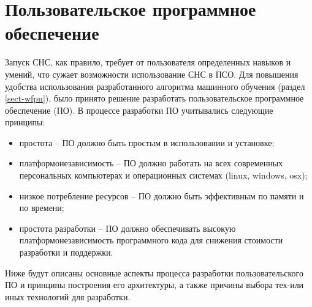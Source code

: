 \section{Пользовательское программное обеспечение}\label{sect-7}

Запуск СНС, как правило, требует от пользователя определенных навыков и умений, что сужает возможности использование СНС в ПСО. Для повышения удобства использования разработанного алгоритма машинного обучения (раздел \ref{sect-wfpn}), было принято решение разработать пользовательское программное обеспечение (ПО). В процессе разработки ПО учитывались следующие принципы:
\begin{itemize}
    \item простота -- ПО должно быть простым в использовании и установке;
    \item платформонезависимость -- ПО должно работать на всех современных персональных компьютерах и операционных системах (linux, windows, osx);
    \item низкое потребление ресурсов -- ПО должно быть эффективным по памяти и по времени;
    \item простота разработки -- ПО должно обеспечивать высокую платформонезависимость программного кода для снижения стоимости разработки и поддержки.
\end{itemize}

Ниже будут описаны основные аспекты процесса разработки пользовательского ПО и принципы построения его архитектуры, а также причины выбора тех-или иных технологий для разработки.




\clearpage